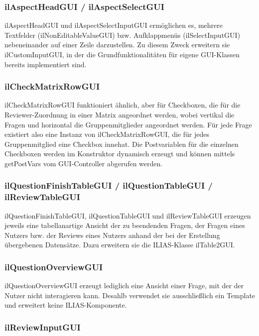 \documentclass[a4paper]{scrreprt}
\begin{document}
\subsubsection{ilAspectHeadGUI / ilAspectSelectGUI}

ilAspectHeadGUI und ilAspectSelectInputGUI ermöglichen es, mehrere Textfelder (ilNonEditableValueGUI) bzw. Aufklappmenüs (ilSelectInputGUI) nebeneinander auf einer Zeile darzustellen. 
Zu diesem Zweck erweitern sie ilCustomInputGUI, in der die Grundfunktionalitäten für eigene GUI-Klassen bereits implementiert sind.

\subsubsection{ilCheckMatrixRowGUI}

ilCheckMatrixRowGUI funktioniert ähnlich, aber für Checkboxen, die für die Reviewer-Zuordnung in einer Matrix angeordnet werden, wobei vertikal die Fragen und horizontal die Gruppenmitglieder angeordnet werden. 
Für jede Frage existiert also eine Instanz von ilCheckMatrixRowGUI, die für jedes Gruppenmitglied eine Checkbox innehat. 
Die Postvariablen für die einzelnen Checkboxen werden im Konstruktor dynamisch erzeugt und können mittels getPostVars vom GUI-Controller abgerufen werden.

\subsubsection{ilQuestionFinishTableGUI / ilQuestionTableGUI / ilReviewTableGUI}

ilQuestionFinishTableGUI, ilQuestionTableGUI und ilReviewTableGUI erzeugen jeweils eine tabellanartige Ansicht der zu beendenden Fragen, der Fragen eines Nutzers bzw. der Reviews eines Nutzers anhand der bei der Erstellung übergebenen Datensätze. 
Dazu erweitern sie die ILIAS-Klasse ilTable2GUI.

\subsubsection{ilQuestionOverviewGUI}

ilQuestionOverviewGUI erzeugt lediglich eine Ansicht einer Frage, mit der der Nutzer nicht interagieren kann. 
Desahlb verwendet sie ausschließlich ein Template und erweitert keine ILIAS-Komponente.

\subsubsection{ilReviewInputGUI}
\end{document}
